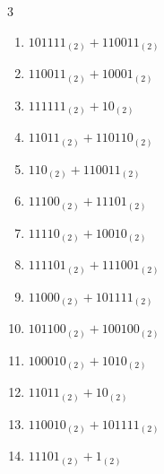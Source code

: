 \begin{multicols}{3}
\begin{enumerate}
  \item $101111_{(2)} + 110011_{(2)}$


  \item $110011_{(2)} + 10001_{(2)}$


  \item $111111_{(2)} + 10_{(2)}$


  \item $11011_{(2)} + 110110_{(2)}$


  \item $110_{(2)} + 110011_{(2)}$


  \item $11100_{(2)} + 11101_{(2)}$


\columnbreak %

  \item $11110_{(2)} + 10010_{(2)}$


  \item $111101_{(2)} + 111001_{(2)}$


  \item $11000_{(2)} + 101111_{(2)}$


  \item $101100_{(2)} + 100100_{(2)}$


  \item $100010_{(2)} + 1010_{(2)}$


  \item $11011_{(2)} + 10_{(2)}$


  \item $110010_{(2)} + 101111_{(2)}$


  \item $11101_{(2)} + 1_{(2)}$


\end{enumerate}
\end{multicols}
